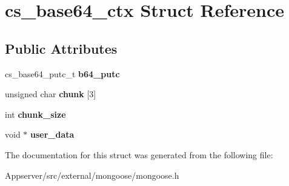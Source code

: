 \hypertarget{structcs__base64__ctx}{}\section{cs\+\_\+base64\+\_\+ctx Struct Reference}
\label{structcs__base64__ctx}
\subsection*{Public Attributes}
\begin{DoxyCompactItemize}
\item 
cs\+\_\+base64\+\_\+putc\+\_\+t {\bfseries b64\+\_\+putc}\hypertarget{structcs__base64__ctx_a59b8384fbdd1681555a9dd18ed6585ae}{}\label{structcs__base64__ctx_a59b8384fbdd1681555a9dd18ed6585ae}

\item 
unsigned char {\bfseries chunk} \mbox{[}3\mbox{]}\hypertarget{structcs__base64__ctx_a209b5eff716d6a1850cca128ed5b070e}{}\label{structcs__base64__ctx_a209b5eff716d6a1850cca128ed5b070e}

\item 
int {\bfseries chunk\+\_\+size}\hypertarget{structcs__base64__ctx_a5753baf57fe83161369e2270d57e4a9e}{}\label{structcs__base64__ctx_a5753baf57fe83161369e2270d57e4a9e}

\item 
void $\ast$ {\bfseries user\+\_\+data}\hypertarget{structcs__base64__ctx_ac6023cc2887001835a99b6a71db9f43b}{}\label{structcs__base64__ctx_ac6023cc2887001835a99b6a71db9f43b}

\end{DoxyCompactItemize}


The documentation for this struct was generated from the following file\+:\begin{DoxyCompactItemize}
\item 
Appserver/src/external/mongoose/mongoose.\+h\end{DoxyCompactItemize}
